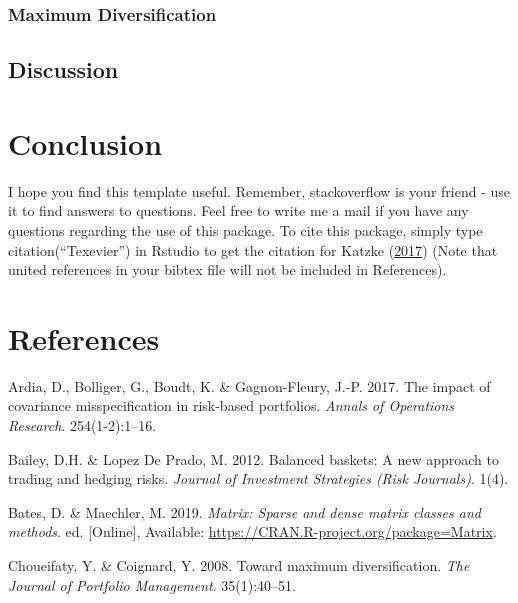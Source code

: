 \documentclass[11pt,preprint, authoryear]{elsarticle}
\numberwithin{equation}{section}
\numberwithin{figure}{section}
\numberwithin{table}{section}
\begin{document}
\hypertarget{maximum-diversification}{%
\subsubsection{Maximum Diversification}\label{maximum-diversification}}

\hypertarget{discussion}{%
\subsection{Discussion}\label{discussion}}

\hypertarget{conclusion}{%
\section{\texorpdfstring{Conclusion
\label{conclusion}}{Conclusion }}\label{conclusion}}

I hope you find this template useful. Remember, stackoverflow is your
friend - use it to find answers to questions. Feel free to write me a
mail if you have any questions regarding the use of this package. To
cite this package, simply type citation(``Texevier'') in Rstudio to get
the citation for Katzke (\protect\hyperlink{ref-Texevier}{2017}) (Note
that united references in your bibtex file will not be included in
References).

\newpage

\hypertarget{references}{%
\section*{References}\label{references}}

\hypertarget{refs}{}
\leavevmode\hypertarget{ref-ardia2017}{}%
Ardia, D., Bolliger, G., Boudt, K. \& Gagnon-Fleury, J.-P. 2017. The
impact of covariance misspecification in risk-based portfolios.
\emph{Annals of Operations Research}. 254(1-2):1--16.

\leavevmode\hypertarget{ref-lopez2012}{}%
Bailey, D.H. \& Lopez De Prado, M. 2012. Balanced baskets: A new
approach to trading and hedging risks. \emph{Journal of Investment
Strategies (Risk Journals)}. 1(4).

\leavevmode\hypertarget{ref-Matrix}{}%
Bates, D. \& Maechler, M. 2019. \emph{Matrix: Sparse and dense matrix
classes and methods}. ed. {[}Online{]}, Available:
\url{https://CRAN.R-project.org/package=Matrix}.

\leavevmode\hypertarget{ref-choueifaty2008}{}%
Choueifaty, Y. \& Coignard, Y. 2008. Toward maximum diversification.
\emph{The Journal of Portfolio Management}. 35(1):40--51.
\end{document}
